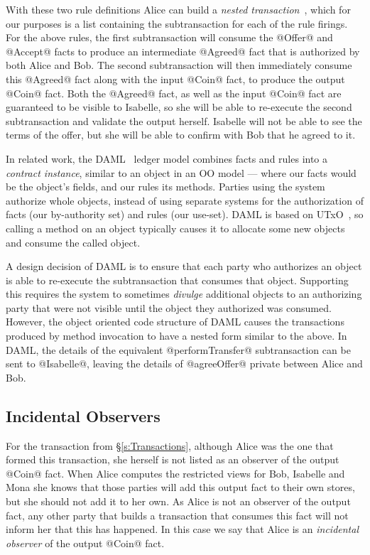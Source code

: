With these two rule definitions Alice can build a \emph{nested transaction}~\cite{Moss1981:Nested}, which for our purposes is a list containing the subtransaction for each of the rule firings. For the above rules, the first subtransaction will consume the @Offer@ and @Accept@ facts to produce an intermediate @Agreed@ fact that is authorized by both Alice and Bob. The second subtransaction will then immediately consume this @Agreed@ fact along with the input @Coin@ fact, to produce the output @Coin@ fact. Both the @Agreed@ fact, as well as the input @Coin@ fact are guaranteed to be visible to Isabelle, so she will be able to re-execute the second subtransaction and validate the output herself. Isabelle will not be able to see the terms of the offer, but she will be able to confirm with Bob that he agreed to it.

In related work, the DAML~\cite{DA2019:DAML} ledger model combines facts and rules into a \emph{contract instance}, similar to an object in an OO model --- where our facts would be the object's fields, and our rules its methods. Parties using the system authorize whole objects, instead of using separate systems for the authorization of facts (our by-authority set) and rules (our use-set). DAML is based on UTxO~\cite{Zahnentferner2018:UTxO}, so calling a method on an object typically causes it to allocate some new objects and consume the called object.

A design decision of DAML is to ensure that each party who authorizes an object is able to re-execute the subtransaction that consumes that object. Supporting this requires the system to sometimes \emph{divulge} additional objects to an authorizing party that were not visible until the object they authorized was consumed. However, the object oriented code structure of DAML causes the transactions produced by method invocation to have a nested form similar to the above. In DAML, the details of the equivalent @performTransfer@ subtransaction can be sent to @Isabelle@, leaving the details of @agreeOffer@ private between Alice and Bob.


\subsection{Incidental Observers}
For the transaction from \S\ref{s:Transactions}, although Alice was the one that formed this transaction, she herself is not listed as an observer of the output @Coin@ fact. When Alice computes the restricted views for Bob, Isabelle and Mona she knows that those parties will add this output fact to their own stores, but she should not add it to her own. As Alice is not an observer of the output fact, any other party that builds a transaction that consumes this fact will not inform her that this has happened. In this case we say that Alice is an \emph{incidental observer} of the output @Coin@ fact.


